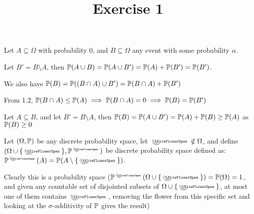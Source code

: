 

\usepackage{skak}
\usepackage{relsize}
\usepackage{graphicx}
\usepackage{mathtools}

\usepackage{textcomp}
\usepackage{bbding}

\usepackage{soul}

\newcommand{\flower}{\text{\scalebox{0.75}{\raisebox{-0.7ex}{
				\rotatebox{90}{\textleaf}\hspace{-0.3em}
				\scalebox{0.7}{\textleaf}\hspace{-1.35em}
				\raisebox{1ex}{\scalebox{0.8}{\FiveFlowerOpen}}
}}}}
\title{Exercise 1}

\maketitle
\begin{cExercise}
	\begin{cPart}
		
		Let $A\subseteq \Omega$ with probability $0$, and $B\subseteq \Omega$ any event with some probability $\alpha$.
		
		Let $B'=B\setminus A$, then $\P(A\cup B)=\P(A\cup B')=\P(A)+\P(B')=\P(B')$.
		
		We also have $\P(B)=\P((B\cap A)\cup B')=\P(B\cap A)+\P(B')$
		
		From 1.2, $\P(B\cap A)\le\P(A)\implies \P(B\cap A)=0\implies \P(B)=\P(B')$
		
	\end{cPart}
	\begin{cPart}
		Let $A\subseteq B$, and let $B'=B\setminus A$, then $\P(B)=\P(A\cup B')=\P(A)+\P(B)\ge \P(A)$ as $\P(B)\ge 0$
		
	\end{cPart}
	\begin{cPart}
		Let $(\Omega, \P)$ be any discrete probability space, let $\flower\notin \Omega$, and define $(\Omega\cup\{\flower\}, \P^{\flower})$ be discrete probability space defined as: $\P^{\flower}(A)=\P(A\setminus\{\flower\})$.
		
		Clearly this is a probability space ($\P^{\flower}(\Omega\cup\{\flower\})=\P(\Omega)=1$, and given any countable set of disjointed subsets of $\Omega\cup\{\flower\}$, at most one of them contains $\flower$, removing the flower from this specific set and looking at the $\sigma$-additivity of $\P$ gives the result)
		

\end{cPart}
\end{cExercise}
